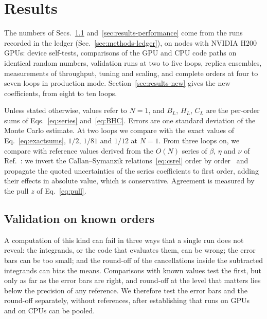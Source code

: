 \section{Results}
\label{sec:results}

The numbers of Secs.~\ref{sec:results-validation} and~\ref{sec:results-performance} come from the runs recorded in
the ledger (Sec.~\ref{sec:methods-ledger}), on nodes with NVIDIA H200 GPUs: device self-tests, comparisons of the GPU
and CPU code paths on identical random numbers, validation runs at two to five loops, replica ensembles,
measurements of throughput, tuning and scaling, and complete orders at four to seven loops in production mode.
Section~\ref{sec:results-new} gives the new coefficients, from eight to ten loops.

Unless stated otherwise, values refer to $N=1$, and $B_L$, $H_L$, $C_L$ are the per-order sums of
Eqs.~\eqref{eq:series} and~\eqref{eq:BHC}. Errors are one standard deviation of the Monte Carlo estimate. At two loops
we compare with the exact values of Eq.~\eqref{eq:exactsums}, $1/2$, $1/81$ and $1/12$ at $N=1$. From three loops on,
we compare with reference values derived from the $O(N)$
series of $\beta$, $\eta$ and $\nu$ of Ref.~\cite{Phi4tools2024}: we invert the Callan--Symanzik
relations~\eqref{eq:csrel} order by order~ and propagate the quoted uncertainties of the series coefficients to first
order, adding their effects in absolute value, which is conservative. Agreement is measured by the pull $z$ of
Eq.~\eqref{eq:pull}.

\subsection{Validation on known orders}
\label{sec:results-validation}

A computation of this kind can fail in three ways that a single run does not reveal: the integrands, or the code
that evaluates them, can be wrong; the error bars can be too small; and the round-off of the cancellations inside the
subtracted integrands can bias the means. Comparisons with known values test the first, but only as far as the error
bars are right, and round-off at the level that matters lies below the precision of any reference. We therefore test
the error bars and the round-off separately, without references, after establishing that runs on GPUs and on CPUs can
be pooled.

